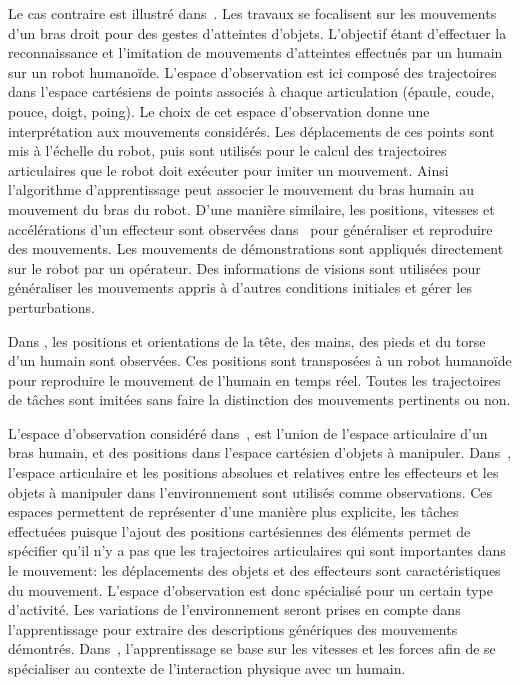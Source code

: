 Le cas contraire est illustré dans~\cite{herzog08}.
Les travaux se focalisent sur les mouvements d'un bras droit pour 
des gestes d'atteintes d'objets.
L'objectif étant d'effectuer la reconnaissance et l'imitation de mouvements d'atteintes
effectués par un humain sur un robot humanoïde.
L'espace d'observation est ici composé des trajectoires dans l'espace cartésiens
de points associés à chaque articulation (épaule, coude, pouce, doigt, poing).
Le choix de cet espace d'observation donne une interprétation aux mouvements considérés.
Les déplacements de ces points sont mis à l'échelle du robot, puis sont utilisés
pour le calcul des trajectoires articulaires
que le robot doit exécuter pour imiter un mouvement. Ainsi
l'algorithme d'apprentissage peut associer le mouvement du bras humain 
au mouvement du bras du robot.
D'une manière similaire, les positions, vitesses et accélérations d'un effecteur sont
observées dans~\cite{hersch08} pour généraliser et reproduire des mouvements.
Les mouvements de démonstrations sont appliqués directement sur le robot par un opérateur.
Des informations de visions sont utilisées pour généraliser les mouvements appris à
d'autres conditions initiales et gérer les perturbations.

Dans \cite{montecillo10}, les positions et orientations
de la tête, des mains, des pieds et du torse d'un humain sont observées. 
Ces positions sont transposées à un robot humanoïde 
pour reproduire le mouvement de l'humain en temps réel.
Toutes les trajectoires de t\^aches sont imitées sans faire
la distinction des mouvements pertinents ou non.

L'espace d'observation considéré dans~\cite{billard03}, est l'union de l'espace articulaire
d'un bras humain, et des positions dans l'espace cartésien d'objets à manipuler.
Dans~\cite{billard06, calinon07a, kwon08, eppner09}, l'espace articulaire et les positions
absolues et relatives entre les effecteurs et les objets à manipuler dans l'environnement sont utilisés
comme observations.
Ces espaces permettent de représenter d'une manière plus explicite,
les t\^aches effectuées puisque l'ajout des positions cartésiennes des éléments
permet de spécifier qu'il n'y a pas que les trajectoires articulaires
qui sont importantes dans le mouvement:  les déplacements des objets et des effecteurs
sont caractéristiques du mouvement. L'espace d'observation est donc spécialisé pour un certain
type d'activité.
Les variations de l'environnement seront prises en compte dans l'apprentissage
pour extraire des descriptions génériques des mouvements démontrés.
Dans~\cite{gribovskaya11}, l'apprentissage se base sur les vitesses et les forces
afin de se spécialiser au contexte de l'interaction physique avec un humain.

